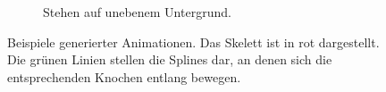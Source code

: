 \begin{figure}
\begin{subfigure}[t]{.4\linewidth}
        \caption{Stehen auf unebenem Untergrund.}
        \label{standing_uneven}
    \end{subfigure}
    \caption{Beispiele generierter Animationen. Das Skelett ist in rot dargestellt. Die grünen Linien stellen die Splines dar, an denen sich die entsprechenden Knochen entlang bewegen.}
\end{figure}
